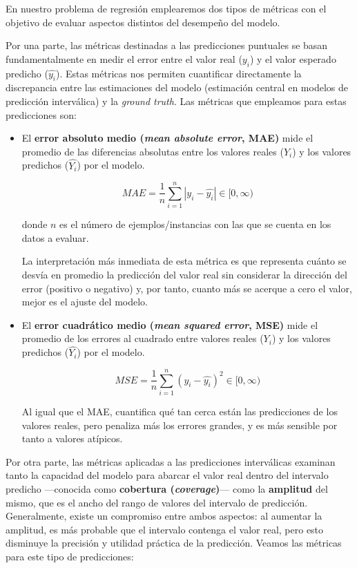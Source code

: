 En nuestro problema de regresión emplearemos dos tipos de métricas con el objetivo de evaluar aspectos distintos del desempeño del modelo.

Por una parte, las métricas destinadas a las predicciones puntuales se basan fundamentalmente en medir el error entre el valor real ($y_i$) y el valor esperado predicho ($\hat{y_i}$). Estas métricas nos permiten cuantificar directamente la discrepancia entre las estimaciones del modelo (estimación central en modelos de predicción interválica) y la \textit{ground truth}. Las métricas que empleamos para estas predicciones son:

\begin{itemize}
    \item El \textbf{error absoluto medio (\textit{mean absolute error}, MAE)} mide el promedio de las diferencias absolutas entre los valores reales ($Y_i$) y los valores predichos ($\hat{Y_i}$) por el modelo.

    $$
    MAE = \frac{1}{n} \sum_{i=1}^n{|y_i - \hat{y_i}|} \in [0, \infty)
    $$

    donde $n$ es el número de ejemplos/instancias con las que se cuenta en los datos a evaluar.

    La interpretación más inmediata de esta métrica es que representa cuánto se desvía en promedio la predicción del valor real sin considerar la dirección del error (positivo o negativo) y, por tanto, cuanto más se acerque a cero el valor, mejor es el ajuste del modelo.

    \item El \textbf{error cuadrático medio (\textit{mean squared error}, MSE)} mide el promedio de los errores al cuadrado entre valores reales ($Y_i$) y los valores predichos ($\hat{Y_i}$) por el modelo.
    
    $$
    MSE = \frac{1}{n} \sum_{i=1}^n{(y_i - \hat{y_i})^2} \in [0, \infty)
    $$

    Al igual que el MAE, cuantifica qué tan cerca están las predicciones de los valores reales, pero penaliza más los errores grandes, y es más sensible por tanto a valores atípicos.

\end{itemize}


Por otra parte, las métricas aplicadas a las predicciones interválicas examinan tanto la capacidad del modelo para abarcar el valor real dentro del intervalo predicho ---conocida como \textbf{cobertura (\textit{coverage})}--- como la \textbf{amplitud} del mismo, que es el ancho del rango de valores del intervalo de predicción. Generalmente, existe un compromiso entre ambos aspectos: al aumentar la amplitud, es más probable que el intervalo contenga el valor real, pero esto disminuye la precisión y utilidad práctica de la predicción. Veamos las métricas para este tipo de predicciones: 

